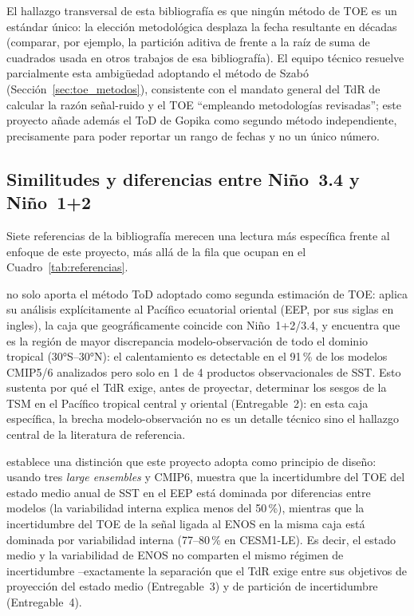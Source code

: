 \documentclass[11pt,a4paper]{article}
\begin{document}
El hallazgo transversal de esta bibliograf\'ia es que ning\'un m\'etodo de TOE es un est\'andar \'unico: la elecci\'on metodol\'ogica desplaza la fecha resultante en d\'ecadas (comparar, por ejemplo, la partici\'on aditiva de \citealp{szabo2016} frente a la ra\'iz de suma de cuadrados usada en otros trabajos de esa bibliograf\'ia). El equipo t\'ecnico resuelve parcialmente esta ambig\"uedad adoptando el m\'etodo de Szab\'o (Secci\'on~\ref{sec:toe_metodos}), consistente con el mandato general del TdR de calcular la raz\'on se\~nal-ruido y el TOE ``empleando metodolog\'ias revisadas''; este proyecto a\~nade adem\'as el ToD de Gopika como segundo m\'etodo independiente, precisamente para poder reportar un rango de fechas y no un \'unico n\'umero.

\subsection{Similitudes y diferencias entre Ni\~no~3.4 y Ni\~no~1+2}
\label{sec:similitudes}

Siete referencias de la bibliografía merecen una lectura más específica frente al enfoque de este proyecto, más allá de la fila que ocupan en el Cuadro~\ref{tab:referencias}.

\citet{gopika2024} no solo aporta el método ToD adoptado como segunda estimación de TOE: aplica su análisis explícitamente al Pacífico ecuatorial oriental (EEP, por sus siglas en ingles), la caja que geográficamente coincide con Ni\~no~1+2/3.4, y encuentra que es la región de mayor discrepancia modelo-observación de todo el dominio tropical (30°S--30°N): el calentamiento es detectable en el 91\,\% de los modelos CMIP5/6 analizados pero solo en 1 de 4 productos observacionales de SST. Esto sustenta por qué el TdR exige, antes de proyectar, determinar los sesgos de la TSM en el Pacífico tropical central y oriental (Entregable~2): en esta caja específica, la brecha modelo-observación no es un detalle técnico sino el hallazgo central de la literatura de referencia.

\citet{zhong2023} establece una distinción que este proyecto adopta como principio de diseño: usando tres \emph{large ensembles} y CMIP6, muestra que la incertidumbre del TOE del estado medio anual de SST en el EEP está dominada por diferencias entre modelos (la variabilidad interna explica menos del 50\,\%), mientras que la incertidumbre del TOE de la señal ligada al ENOS en la misma caja está dominada por variabilidad interna (77--80\,\% en CESM1-LE). Es decir, el estado medio y la variabilidad de ENOS no comparten el mismo régimen de incertidumbre --exactamente la separación que el TdR exige entre sus objetivos de proyección del estado medio (Entregable~3) y de partición de incertidumbre (Entregable~4).
\end{document}
